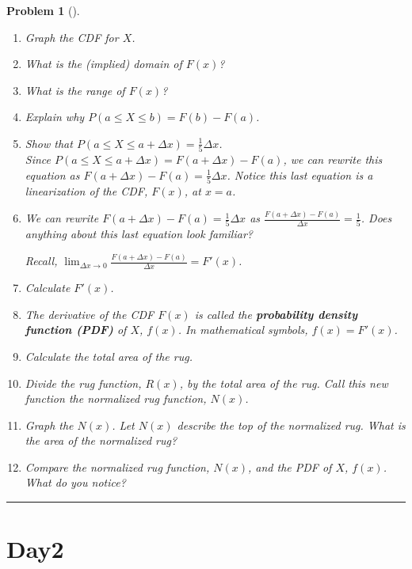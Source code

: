 \documentclass[letterpaper,oneside]{book}%
\theoremstyle{plain}
\theoremstyle{box}
\theoremstyle{problem}
\newtheorem{problemnum}{Problem}[chapter]
\newenvironment{problem}[1][]{\begin{problemnum}[#1]}{\end{problemnum}\nopagebreak\hrule\bigskip}
\begin{document}
\begin{problem}
\begin{enumerate}
\begin{enumerate}
   \item Explain why $$F(x) =\begin{cases}0 & x \leq 0 \\\frac{1}{5}x & 0 < x < 5 \\ 1 & x \geq 5.\end{cases}$$
   \end{enumerate}
  \item Graph the CDF for $X$.
  \item What is the (implied) domain of $F(x)$?
  \item What is the range of $F(x)$? 
  \item Explain why $P(a \leq X \leq b) = F(b) - F(a)$.
  \item Show that $P(a \leq X \leq a +\Delta x) = \frac{1}{5} \Delta x$.\\ 
  Since $P(a \leq X \leq a +\Delta x) = F(a + \Delta x) - F(a)$, we can rewrite this equation as $F(a + \Delta x) - F(a) = \frac{1}{5} \Delta x$. Notice this last equation is a linearization of the CDF, $F(x)$, at $x = a$.
  \item We can rewrite $F(a + \Delta x) - F(a) = \frac{1}{5} \Delta x$ as $\frac{F(a + \Delta x) - F(a)}{\Delta x} = \frac{1}{5}$. Does anything about this last equation look familiar?
  
Recall, $\lim_{\Delta x \rightarrow 0}\frac{F(a + \Delta x) - F(a)}{\Delta x} = F'(x)$.
  \item Calculate $F'(x)$.
  \item The derivative of the CDF $F(x)$ is called the \textbf{probability density function (PDF)} of $X$, $f(x)$. In mathematical symbols, $f(x) = F'(x)$.
  \item Calculate the total area of the rug.
  \item Divide the rug function, $R(x)$, by the total area of the rug. Call this new function the normalized rug function, $N(x)$.
  \item Graph the $N(x)$. Let $N(x)$ describe the top of the normalized rug. What is the area of the normalized rug?
  \item Compare the normalized rug function, $N(x)$, and the PDF of $X$, $f(x)$. What do you notice?
 \end{enumerate}
\end{problem}





\section{Day2}
\end{document}
